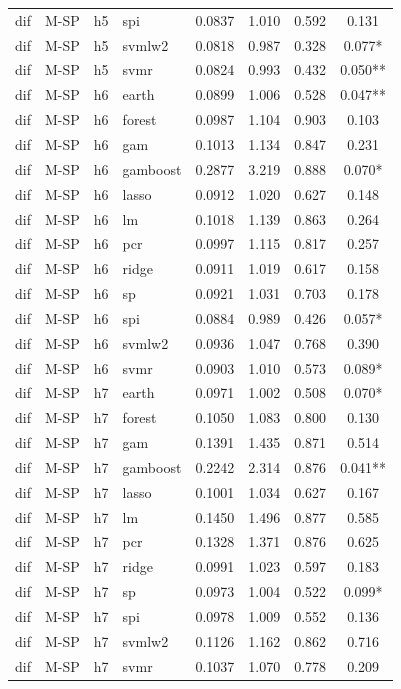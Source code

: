 \begin{ThreePartTable}
\begin{longtable}[t]{llclcccc}
dif & M-SP & h5 & spi & 0.0837 & 1.010 & 0.592 & 0.131\\
dif & M-SP & h5 & svmlw2 & 0.0818 & 0.987 & 0.328 & 0.077*\\
dif & M-SP & h5 & svmr & 0.0824 & 0.993 & 0.432 & 0.050**\\
\addlinespace
dif & M-SP & h6 & earth & 0.0899 & 1.006 & 0.528 & 0.047**\\
dif & M-SP & h6 & forest & 0.0987 & 1.104 & 0.903 & 0.103\\
dif & M-SP & h6 & gam & 0.1013 & 1.134 & 0.847 & 0.231\\
dif & M-SP & h6 & gamboost & 0.2877 & 3.219 & 0.888 & 0.070*\\
dif & M-SP & h6 & lasso & 0.0912 & 1.020 & 0.627 & 0.148\\
dif & M-SP & h6 & lm & 0.1018 & 1.139 & 0.863 & 0.264\\
dif & M-SP & h6 & pcr & 0.0997 & 1.115 & 0.817 & 0.257\\
dif & M-SP & h6 & ridge & 0.0911 & 1.019 & 0.617 & 0.158\\
dif & M-SP & h6 & sp & 0.0921 & 1.031 & 0.703 & 0.178\\
dif & M-SP & h6 & spi & 0.0884 & 0.989 & 0.426 & 0.057*\\
dif & M-SP & h6 & svmlw2 & 0.0936 & 1.047 & 0.768 & 0.390\\
dif & M-SP & h6 & svmr & 0.0903 & 1.010 & 0.573 & 0.089*\\
\addlinespace
dif & M-SP & h7 & earth & 0.0971 & 1.002 & 0.508 & 0.070*\\
dif & M-SP & h7 & forest & 0.1050 & 1.083 & 0.800 & 0.130\\
dif & M-SP & h7 & gam & 0.1391 & 1.435 & 0.871 & 0.514\\
dif & M-SP & h7 & gamboost & 0.2242 & 2.314 & 0.876 & 0.041**\\
dif & M-SP & h7 & lasso & 0.1001 & 1.034 & 0.627 & 0.167\\
dif & M-SP & h7 & lm & 0.1450 & 1.496 & 0.877 & 0.585\\
dif & M-SP & h7 & pcr & 0.1328 & 1.371 & 0.876 & 0.625\\
dif & M-SP & h7 & ridge & 0.0991 & 1.023 & 0.597 & 0.183\\
dif & M-SP & h7 & sp & 0.0973 & 1.004 & 0.522 & 0.099*\\
dif & M-SP & h7 & spi & 0.0978 & 1.009 & 0.552 & 0.136\\
dif & M-SP & h7 & svmlw2 & 0.1126 & 1.162 & 0.862 & 0.716\\
dif & M-SP & h7 & svmr & 0.1037 & 1.070 & 0.778 & 0.209\\

\end{longtable}
\end{ThreePartTable}
